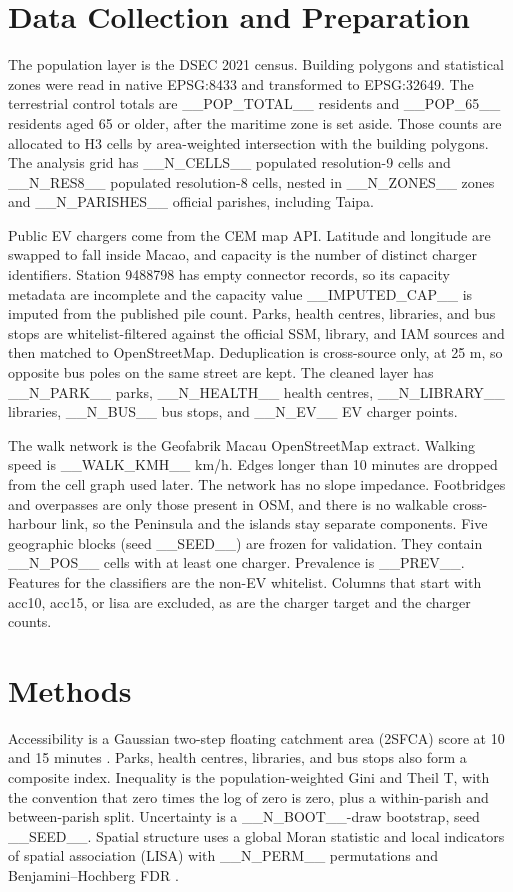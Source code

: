 \documentclass[11pt,a4paper]{article}
\begin{document}
\section{Data Collection and Preparation}
The population layer is the DSEC 2021 census. Building polygons and statistical zones were read in native EPSG:8433 and transformed to EPSG:32649. The terrestrial control totals are __POP_TOTAL__ residents and __POP_65__ residents aged 65 or older, after the maritime zone is set aside. Those counts are allocated to H3 cells by area-weighted intersection with the building polygons. The analysis grid has __N_CELLS__ populated resolution-9 cells and __N_RES8__ populated resolution-8 cells, nested in __N_ZONES__ zones and __N_PARISHES__ official parishes, including Taipa.

Public EV chargers come from the CEM map API. Latitude and longitude are swapped to fall inside Macao, and capacity is the number of distinct charger identifiers. Station 9488798 has empty connector records, so its capacity metadata are incomplete and the capacity value __IMPUTED_CAP__ is imputed from the published pile count. Parks, health centres, libraries, and bus stops are whitelist-filtered against the official SSM, library, and IAM sources and then matched to OpenStreetMap. Deduplication is cross-source only, at 25 m, so opposite bus poles on the same street are kept. The cleaned layer has __N_PARK__ parks, __N_HEALTH__ health centres, __N_LIBRARY__ libraries, __N_BUS__ bus stops, and __N_EV__ EV charger points.

The walk network is the Geofabrik Macau OpenStreetMap extract. Walking speed is __WALK_KMH__ km/h. Edges longer than 10 minutes are dropped from the cell graph used later. The network has no slope impedance. Footbridges and overpasses are only those present in OSM, and there is no walkable cross-harbour link, so the Peninsula and the islands stay separate components. Five geographic blocks (seed __SEED__) are frozen for validation. They contain __N_POS__ cells with at least one charger. Prevalence is __PREV__. Features for the classifiers are the non-EV whitelist. Columns that start with acc10, acc15, or lisa are excluded, as are the charger target and the charger counts.

\section{Methods}
Accessibility is a Gaussian two-step floating catchment area (2SFCA) score at 10 and 15 minutes \citep{luo2003}. Parks, health centres, libraries, and bus stops also form a composite index. Inequality is the population-weighted Gini and Theil T, with the convention that zero times the log of zero is zero, plus a within-parish and between-parish split. Uncertainty is a __N_BOOT__-draw bootstrap, seed __SEED__. Spatial structure uses a global Moran statistic and local indicators of spatial association (LISA) with __N_PERM__ permutations and Benjamini--Hochberg FDR \citep{anselin1995}.
\end{document}

